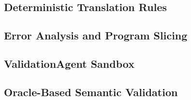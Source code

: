 \documentclass[12pt,a4paper]{report}
\begin{document}
  \subsection{Deterministic Translation Rules}
  \label{subsec:deterministic-rules}

  \subsection{Error Analysis and Program Slicing}
  \label{subsec:error-analysis-slicing}

  \subsection{ValidationAgent Sandbox}
  \label{subsec:sandbox-impl}

  \subsection{Oracle-Based Semantic Validation}
  \label{subsec:semantic-validator-impl}
\end{document}

